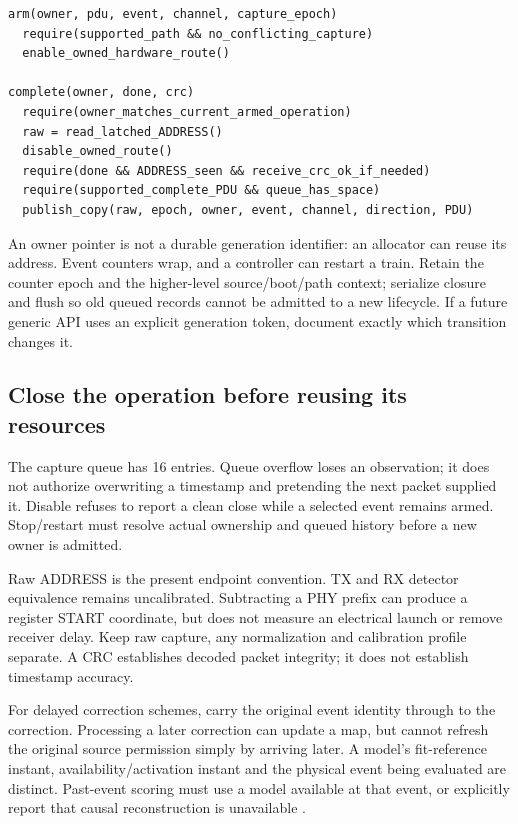 \documentclass[10pt,letterpaper]{article}
\begin{document}
\begin{lstlisting}[caption={Illustrative contract; not a replacement driver.}]
arm(owner, pdu, event, channel, capture_epoch)
  require(supported_path && no_conflicting_capture)
  enable_owned_hardware_route()

complete(owner, done, crc)
  require(owner_matches_current_armed_operation)
  raw = read_latched_ADDRESS()
  disable_owned_route()
  require(done && ADDRESS_seen && receive_crc_ok_if_needed)
  require(supported_complete_PDU && queue_has_space)
  publish_copy(raw, epoch, owner, event, channel, direction, PDU)
\end{lstlisting}
An owner pointer is not a durable generation identifier: an allocator can reuse its address. Event counters wrap, and a controller can restart a train. Retain the counter epoch and the higher-level source/boot/path context; serialize closure and flush so old queued records cannot be admitted to a new lifecycle. If a future generic API uses an explicit generation token, document exactly which transition changes it.

\subsection{Close the operation before reusing its resources}
The capture queue has 16 entries. Queue overflow loses an observation; it does not authorize overwriting a timestamp and pretending the next packet supplied it. Disable refuses to report a clean close while a selected event remains armed. Stop/restart must resolve actual ownership and queued history before a new owner is admitted.

Raw ADDRESS is the present endpoint convention. TX and RX detector equivalence remains uncalibrated. Subtracting a PHY prefix can produce a register START coordinate, but does not measure an electrical launch or remove receiver delay. Keep raw capture, any normalization and calibration profile separate. A CRC establishes decoded packet integrity; it does not establish timestamp accuracy.

For delayed correction schemes, carry the original event identity through to the correction. Processing a later correction can update a map, but cannot refresh the original source permission simply by arriving later. A model's fit-reference instant, availability/activation instant and the physical event being evaluated are distinct. Past-event scoring must use a model available at that event, or explicitly report that causal reconstruction is unavailable \cite{archive,own}.
\end{document}
